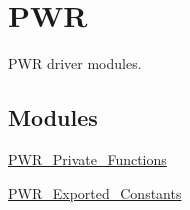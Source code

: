 \hypertarget{group___p_w_r}{}\section{P\+W\+R}
\label{group___p_w_r}


P\+W\+R driver modules.  


\subsection*{Modules}
\begin{DoxyCompactItemize}
\item 
\hyperlink{group___p_w_r___private___functions}{P\+W\+R\+\_\+\+Private\+\_\+\+Functions}
\item 
\hyperlink{group___p_w_r___exported___constants}{P\+W\+R\+\_\+\+Exported\+\_\+\+Constants}
\end{DoxyCompactItemize}
